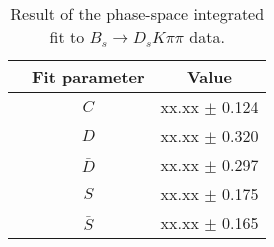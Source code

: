 \begin{table}[h]
\centering
\caption{Result of the phase-space integrated fit to $B_s \to D_s K \pi \pi$ data.}
\begin{tabular}{c c c}
\hline
\hline
& Fit parameter & Value \\
\hline
& $C$ &  xx.xx  $\pm$ 0.124\\
&$D$ &  xx.xx  $\pm$ 0.320\\
&$\bar D$ &  xx.xx  $\pm$ 0.297\\
& $S$ &  xx.xx  $\pm$ 0.175\\
& $\bar S$ &  xx.xx  $\pm$ 0.165\\
\hline
\hline
\end{tabular}
\label{table:timeFit_signal}
\end{table}